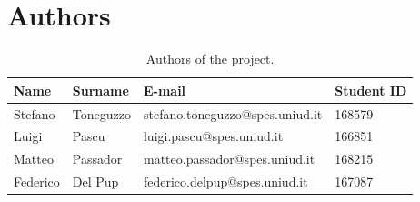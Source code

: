 \documentclass[a4paper,12pt]{article}
\begin{document}
\section{Authors}
\begin{table}[htbp]
\centering
\small
\caption{Authors of the project.}
\label{tab:autori}
\begin{tabularx}{\textwidth}{X X l X}
\toprule
\textbf{Name} & \textbf{Surname} & \textbf{E-mail} & \textbf{Student ID} \\ 
\midrule
Stefano & Toneguzzo & stefano.toneguzzo@spes.uniud.it & 168579 \\ 
\midrule
Luigi & Pascu & luigi.pascu@spes.uniud.it & 166851 \\ 
\midrule
Matteo & Passador & matteo.passador@spes.uniud.it & 168215 \\
\midrule 
Federico & Del Pup & federico.delpup@spes.uniud.it & 167087 \\ 
\bottomrule
\end{tabularx}
\end{table}
\end{document}
